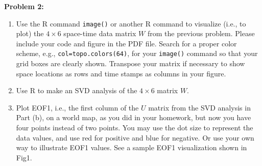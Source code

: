 \documentclass[12pt]{article}
\newenvironment{problem}[1]{
    \textbf{Problem #1:}
}{
    \rmfamily \vspace{2em}
}
\begin{document}
\begin{problem}{2}
    \begin{enumerate}[label=\alph*)]
        \item Use the R command \texttt{image()} or another R command to visualize (i.e., to plot) the $4 \times 6$
        space-time data matrix $W$ from the previous problem. Please include your code and figure in the PDF file.
        Search for a proper color scheme, e.g., \texttt{col=topo.colors(64)}, for your \texttt{image()} command
        so that your grid boxes are clearly shown. Transpose your matrix if necessary
        to show space locations as rows and time stamps as columns in your figure.
        \item Use R to make an SVD analysis of the $4 \times 6$ matrix $W$.
        \item Plot EOF1, i.e., the first column of the $U$ matrix from the SVD analysis in Part (b), on a
        world map, as you did in your homework, but now you have four points instead of two points. You may
        use the dot size to represent the data values, and use red for positive and blue for negative. Or use your
        own way to illustrate EOF1 values. See a sample EOF1 visualization shown in Fig1.
    \end{enumerate}
\end{problem}
\end{document}
